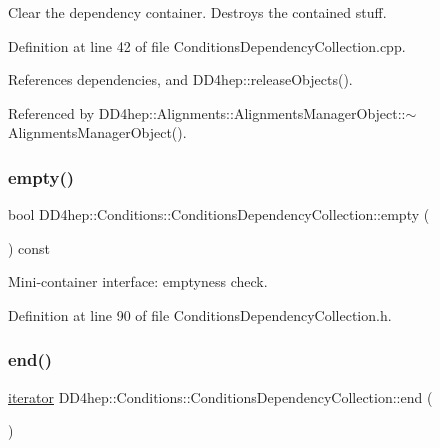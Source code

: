Clear the dependency container. Destroys the contained stuff. 



Definition at line 42 of file Conditions\+Dependency\+Collection.\+cpp.



References dependencies, and D\+D4hep\+::release\+Objects().



Referenced by D\+D4hep\+::\+Alignments\+::\+Alignments\+Manager\+Object\+::$\sim$\+Alignments\+Manager\+Object().

\hypertarget{class_d_d4hep_1_1_conditions_1_1_conditions_dependency_collection_aa201768f743d5d58188ca5412ea6e10f}{}\label{class_d_d4hep_1_1_conditions_1_1_conditions_dependency_collection_aa201768f743d5d58188ca5412ea6e10f} 
\subsubsection{\texorpdfstring{empty()}{empty()}}
{\footnotesize\ttfamily bool D\+D4hep\+::\+Conditions\+::\+Conditions\+Dependency\+Collection\+::empty (\begin{DoxyParamCaption}{ }\end{DoxyParamCaption}) const\hspace{0.3cm}{\ttfamily [inline]}}



Mini-\/container interface\+: emptyness check. 



Definition at line 90 of file Conditions\+Dependency\+Collection.\+h.

\hypertarget{class_d_d4hep_1_1_conditions_1_1_conditions_dependency_collection_a6c3a1c17490c6e6f1eece6b9fe3b0db9}{}\label{class_d_d4hep_1_1_conditions_1_1_conditions_dependency_collection_a6c3a1c17490c6e6f1eece6b9fe3b0db9} 
\subsubsection{\texorpdfstring{end()}{end()}\hspace{0.1cm}{\footnotesize\ttfamily [1/2]}}
{\footnotesize\ttfamily \hyperlink{class_d_d4hep_1_1_conditions_1_1_conditions_dependency_collection_a685a1a6841f2fa4d70ab9a9bfb7b0b6a}{iterator} D\+D4hep\+::\+Conditions\+::\+Conditions\+Dependency\+Collection\+::end (\begin{DoxyParamCaption}{ }\end{DoxyParamCaption})\hspace{0.3cm}{\ttfamily [inline]}}



